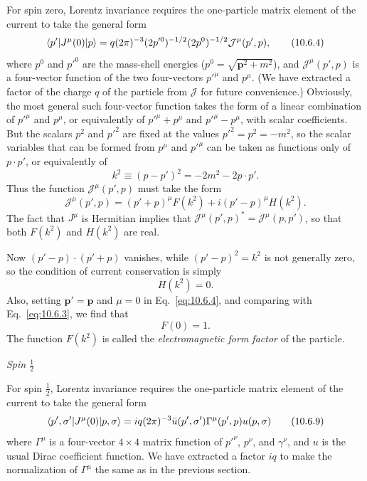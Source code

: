 For spin zero, Lorentz invariance requires the one-particle matrix element of
the current to take the general form
\begin{equation}
  \langle p'\rvert J^\mu(0)\lvert p\rangle
  =q(2\pi)^{-3}(2p'^0)^{-1/2}(2p^0)^{-1/2}\mathcal J^\mu(p',p),
  \tag{10.6.4}\label{eq:10.6.4}
\end{equation}
where $p^0$ and $p'^0$ are the mass-shell energies
($p^0=\sqrt{\mathbf{p}^2+m^2}$), and $\mathcal J^\mu(p',p)$ is a four-vector
function of the two four-vectors $p'^\mu$ and $p^\mu$. (We have extracted a
factor of the charge $q$ of the particle from $\mathcal J$ for future
convenience.) Obviously, the most general such four-vector function takes the
form of a linear combination of $p'^\mu$ and $p^\mu$, or equivalently of
$p'^\mu+p^\mu$ and $p'^\mu-p^\mu$, with scalar coefficients. But the scalars
$p^2$ and $p'^2$ are fixed at the values $p'^2=p^2=-m^2$, so the scalar
variables that can be formed from $p^\mu$ and $p'^\mu$ can be taken as
functions only of $p\cdot p'$, or equivalently of
\begin{equation}
  k^2\equiv(p-p')^2=-2m^2-2p\cdot p'.
  \tag{10.6.5}\label{eq:10.6.5}
\end{equation}
Thus the function $\mathcal J^\mu(p',p)$ must take the form
\begin{equation}
  \mathcal J^\mu(p',p)
  =(p'+p)^\mu F(k^2)+i(p'-p)^\mu H(k^2).
  \tag{10.6.6}\label{eq:10.6.6}
\end{equation}
The fact that $J^\mu$ is Hermitian implies that
$\mathcal J^\mu(p',p)^*=\mathcal J^\mu(p,p')$, so that both $F(k^2)$ and
$H(k^2)$ are real.

Now $(p'-p)\cdot(p'+p)$ vanishes, while $(p'-p)^2=k^2$ is not generally
zero, so the condition of current conservation is simply
\begin{equation}
  H(k^2)=0.
  \tag{10.6.7}\label{eq:10.6.7}
\end{equation}
Also, setting $\mathbf{p}'=\mathbf{p}$ and $\mu=0$ in
Eq.~\eqref{eq:10.6.4}, and comparing with Eq.~\eqref{eq:10.6.3}, we find that
\begin{equation}
  F(0)=1.
  \tag{10.6.8}\label{eq:10.6.8}
\end{equation}
The function $F(k^2)$ is called the \emph{electromagnetic form factor} of the
particle.

\begin{center}
  \emph{Spin $\frac12$}
\end{center}

For spin $\frac12$, Lorentz invariance requires the one-particle matrix element
of the current to take the general form
\begin{equation}
  \langle p',\sigma'\rvert J^\mu(0)\lvert p,\sigma\rangle
  =iq(2\pi)^{-3}\bar u(p',\sigma')\Gamma^\mu(p',p)u(p,\sigma)
  \tag{10.6.9}\label{eq:10.6.9}
\end{equation}
where $\Gamma^\mu$ is a four-vector $4\times4$ matrix function of $p'^\nu$,
$p^\nu$, and $\gamma^\nu$, and $u$ is the usual Dirac coefficient function.
We have extracted a factor $iq$ to make the normalization of $\Gamma^\mu$ the
same as in the previous section.

